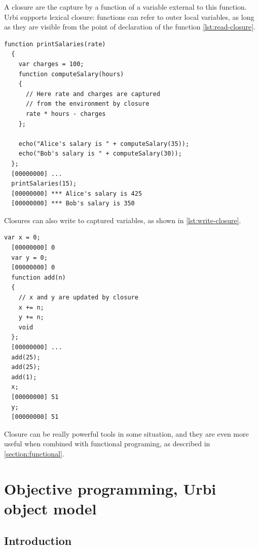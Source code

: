 \documentclass[openright,twoside,12pt]{report}
\newcommand{\urbi}{Urbi\xspace}
\newcommand{\lst}[1]{\autoref{lst:#1}}
\begin{document}
A closure are the capture by a function of a variable external to this
function. \urbi supports lexical closure: functions can refer to outer
local variables, as long as they are visible from the point of
declaration of the function \lst{read-closure}.

\begin{lstlisting}[caption=Capturing variables with lexical closures,
  label=lst:read-closure]
  function printSalaries(rate)
  {
    var charges = 100;
    function computeSalary(hours)
    {
      // Here rate and charges are captured
      // from the environment by closure
      rate * hours - charges
    };

    echo("Alice's salary is " + computeSalary(35));
    echo("Bob's salary is " + computeSalary(30));
  };
  [00000000] ...
  printSalaries(15);
  [00000000] *** Alice's salary is 425
  [00000000] *** Bob's salary is 350
\end{lstlisting}

Closures can also write to captured variables, as shown in
\lst{write-closure}.

\begin{lstlisting}[caption=Updating captured variables,
  label=lst:write-closure]
  var x = 0;
  [00000000] 0
  var y = 0;
  [00000000] 0
  function add(n)
  {
    // x and y are updated by closure
    x += n;
    y += n;
    void
  };
  [00000000] ...
  add(25);
  add(25);
  add(1);
  x;
  [00000000] 51
  y;
  [00000000] 51
\end{lstlisting}

Closure can be really powerful tools in some situation, and they are
even more useful when combined with functional programing, as
described in \autoref{section:functional}.


\chapter{Objective programming, \urbi object model}
\label{section:objective}


\section{Introduction}
\end{document}
